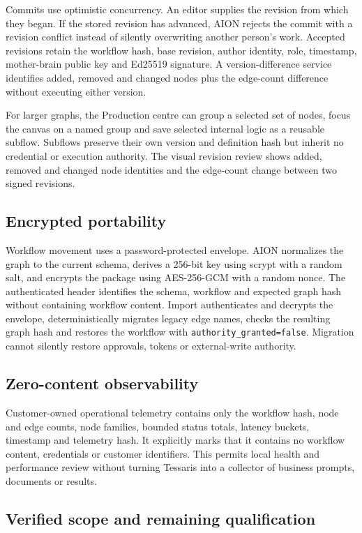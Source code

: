 Commits use optimistic concurrency. An editor supplies the revision from which they began. If the
stored revision has advanced, AION rejects the commit with a revision conflict instead of silently
overwriting another person's work. Accepted revisions retain the workflow hash, base revision,
author identity, role, timestamp, mother-brain public key and Ed25519 signature. A version-difference
service identifies added, removed and changed nodes plus the edge-count difference without executing
either version.

For larger graphs, the Production centre can group a selected set of nodes, focus the canvas on a
named group and save selected internal logic as a reusable subflow. Subflows preserve their own
version and definition hash but inherit no credential or execution authority. The visual revision
review shows added, removed and changed node identities and the edge-count change between two signed
revisions.

\subsection{Encrypted portability}

Workflow movement uses a password-protected envelope. AION normalizes the graph to the current
schema, derives a 256-bit key using scrypt with a random salt, and encrypts the package using
AES-256-GCM with a random nonce. The authenticated header identifies the schema, workflow and
expected graph hash without containing workflow content. Import authenticates and decrypts the
envelope, deterministically migrates legacy edge names, checks the resulting graph hash and restores
the workflow with \texttt{authority\_granted=false}. Migration cannot silently restore approvals,
tokens or external-write authority.

\subsection{Zero-content observability}

Customer-owned operational telemetry contains only the workflow hash, node and edge counts, node
families, bounded status totals, latency buckets, timestamp and telemetry hash. It explicitly marks
that it contains no workflow content, credentials or customer identifiers. This permits local
health and performance review without turning Tessaris into a collector of business prompts,
documents or results.

\subsection{Verified scope and remaining qualification}

